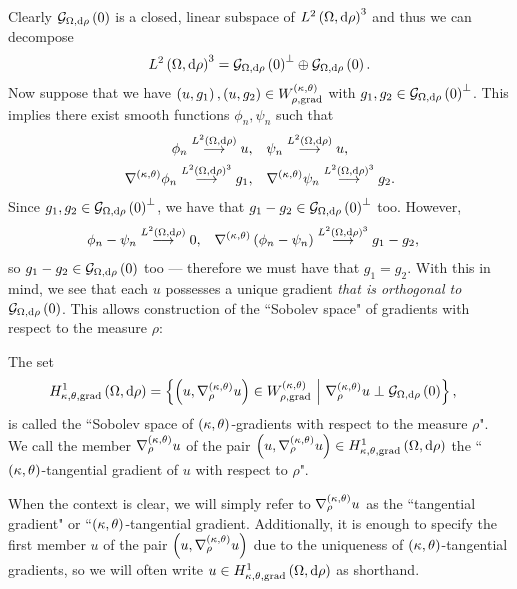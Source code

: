 Clearly $\gradZero{\ddom}{\rho}$ is a closed, linear subspace of $\ltwo{\ddom}{\rho}^3$ and thus we can decompose 
\begin{align*}
	\ltwo{\ddom}{\rho}^3 = \gradZero{\ddom}{\rho}^{\perp} \oplus \gradZero{\ddom}{\rho}.
\end{align*}
Now suppose that we have $\bracs{u,g_1}, \bracs{u,g_2}\in W^{\kt}_{\rho,\mathrm{grad}}$ with $g_1, g_2\in\gradZero{\ddom}{\rho}^\perp$.
This implies there exist smooth functions $\phi_n, \psi_n$ such that
\begin{align*}
	\phi_n \lconv{\ltwo{\ddom}{\rho}} u, &\quad \psi_n \lconv{\ltwo{\ddom}{\rho}} u, \\
	\ktgrad\phi_n \lconv{\ltwo{\ddom}{\rho}^3} g_1, &\quad \ktgrad\psi_n \lconv{\ltwo{\ddom}{\rho}^3} g_2.
\end{align*}
Since $g_1, g_2\in \gradZero{\ddom}{\rho}^{\perp}$, we have that $g_1-g_2\in \gradZero{\ddom}{\rho}^{\perp}$ too.
However, 
\begin{align*}
	\phi_n - \psi_n \lconv{\ltwo{\ddom}{\rho}} 0, &\quad \ktgrad\bracs{\phi_n-\psi_n} \lconv{\ltwo{\ddom}{\rho}^3} g_1 - g_2,
\end{align*}
so $g_1 - g_2\in \gradZero{\ddom}{\rho}$ too --- therefore we must have that $g_1=g_2$.
With this in mind, we see that each $u$ possesses a unique gradient \emph{that is orthogonal to} $\gradZero{\ddom}{\rho}$.
This allows construction of the ``Sobolev space" of gradients with respect to the measure $\rho$:
\begin{definition} \label{def:3DGradSobSpace}
	The set
	\begin{align*}
		\ktgradSob{\ddom}{\rho} &= \clbracs{ \bracs{u, \ktgrad_{\rho}u}\in W^{\kt}_{\rho,\mathrm{grad}} \setVert \ktgrad_{\rho}u \perp \gradZero{\ddom}{\rho} },
	\end{align*}
	is called the ``Sobolev space of $\kt$-gradients with respect to the measure $\rho$".
	We call the member $\ktgrad_{\rho}u$ of the pair $\bracs{u, \ktgrad_{\rho}u}\in\ktgradSob{\ddom}{\rho}$ the ``$\kt$-tangential gradient of $u$ with respect to $\rho$".
\end{definition}
When the context is clear, we will simply refer to $\ktgrad_{\rho}u$ as the ``tangential gradient" or ``$\kt$-tangential gradient.
Additionally, it is enough to specify the first member $u$ of the pair $\bracs{u, \ktgrad_{\rho}u}$ due to the uniqueness of $\kt$-tangential gradients, so we will often write $u\in\ktgradSob{\ddom}{\rho}$ as shorthand.

